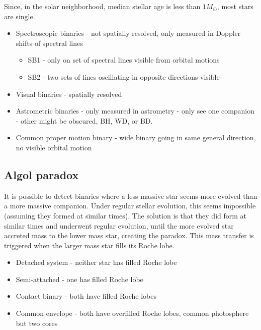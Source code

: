 \documentclass{article}
\begin{document}
Since, in the solar neighborhood, median stellar age is less than $1M_\odot$, most stars are single.

\begin{itemize}
    \item Spectroscopic binaries - not spatially resolved, only measured in Doppler shifts of spectral lines
    \begin{itemize}
        \item SB1 - only on set of spectral lines visible from orbital motions

        \item SB2 - two sets of lines oscillating in opposite directions visible
    \end{itemize}

    \item Visual binaries - spatially resolved

    \item Astrometric binaries - only measured in astrometry - only see one companion - other might be obscured, BH, WD, or BD.

    \item Common proper motion binary - wide binary going in same general direction, no visible orbital motion
\end{itemize}

\subsection{Algol paradox}

It is possible to detect binaries where a less massive star seems more evolved than a more massive companion. Under regular stellar evolution, this seems impossible (assuming they formed at similar times). The solution is that  they did form at similar times and underwent regular evolution, until the more evolved star accreted mass to the lower mass star, creating the paradox. This mass transfer is triggered when the larger mass star fills its Roche lobe.

\begin{itemize}
    \item Detached system - neither star has filled Roche lobe

    \item Semi-attached - one has filled Roche lobe

    \item Contact binary - both have  filled Roche lobes

    \item Common envelope - both have overfilled Roche lobes, common photosphere but two cores
\end{itemize}
\end{document}
